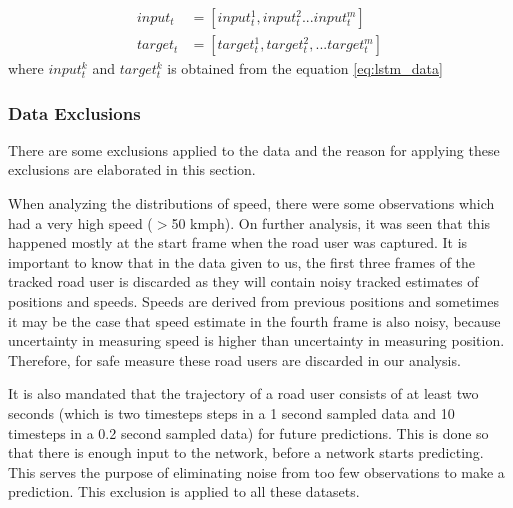 \documentclass{article}
\begin{document}
\begin{equation}\label{eq:transformers_data}
    \begin{split}
        input_t&=[input^{1}_t,input^{2}_t...input^{m}_t]\\
        target_t&=[target^{1}_t,target^{2}_t,...target^{m}_t]
    \end{split}
\end{equation}
where $input^{k}_t$ and $target^{k}_t$ is obtained from the equation \ref{eq:lstm_data}

\subsubsection{Data Exclusions}\label{ssec:exclusions}
There are some exclusions applied to the data and the reason for applying these exclusions are elaborated in this section. 

When analyzing the distributions of speed, there were some observations which had a very high speed ($>$50 kmph). On further analysis, it was seen that this happened mostly at the start frame when the road user was captured.  It is important to know that in the data given to us, the first three frames of the tracked road user is discarded as they will contain noisy tracked estimates of positions and speeds. Speeds are derived from previous positions and sometimes it may be the case that speed estimate in the fourth frame is also noisy, because uncertainty in measuring speed is higher than uncertainty in measuring position. Therefore,  for safe measure these road users are discarded in our analysis.

It is also mandated that the trajectory of a road user consists of at least two seconds (which is two timesteps steps in a 1 second sampled data and 10 timesteps in a 0.2 second sampled data) for future predictions. This is done so that there is enough input to the network, before a network starts predicting. This serves the purpose of eliminating noise from too few observations to make a prediction. This exclusion is applied to all these datasets. 
\end{document}
